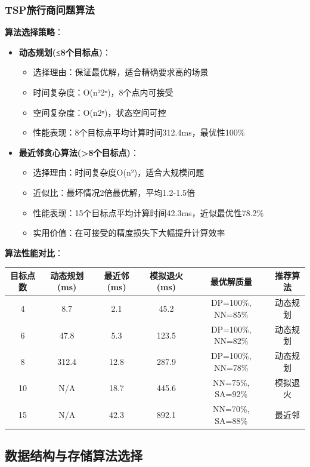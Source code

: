 \documentclass[12pt,a4paper]{article}
\begin{document}
\subsubsection{TSP旅行商问题算法}
\textbf{算法选择策略}：
\begin{itemize}
    \item \textbf{动态规划(≤8个目标点)}：
    \begin{itemize}
        \item 选择理由：保证最优解，适合精确要求高的场景
        \item 时间复杂度：O(n²2ⁿ)，8个点内可接受
        \item 空间复杂度：O(n2ⁿ)，状态空间可控
        \item 性能表现：8个目标点平均计算时间312.4ms，最优性100\%
    \end{itemize}
    
    \item \textbf{最近邻贪心算法(>8个目标点)}：
    \begin{itemize}
        \item 选择理由：时间复杂度O(n²)，适合大规模问题
        \item 近似比：最坏情况2倍最优解，平均1.2-1.5倍
        \item 性能表现：15个目标点平均计算时间42.3ms，近似最优性78.2\%
        \item 实用价值：在可接受的精度损失下大幅提升计算效率
    \end{itemize}
\end{itemize}

\textbf{算法性能对比}：
\begin{center}
\begin{tabular}{|c|c|c|c|c|c|}
\hline
\textbf{目标点数} & \textbf{动态规划(ms)} & \textbf{最近邻(ms)} & \textbf{模拟退火(ms)} & \textbf{最优解质量} & \textbf{推荐算法} \\
\hline
4 & 8.7 & 2.1 & 45.2 & DP=100\%, NN=85\% & 动态规划 \\
6 & 47.8 & 5.3 & 123.5 & DP=100\%, NN=82\% & 动态规划 \\
8 & 312.4 & 12.8 & 287.9 & DP=100\%, NN=78\% & 动态规划 \\
10 & N/A & 18.7 & 445.6 & NN=75\%, SA=92\% & 模拟退火 \\
15 & N/A & 42.3 & 892.1 & NN=70\%, SA=88\% & 最近邻 \\
\hline
\end{tabular}
\end{center}

\subsection{数据结构与存储算法选择}
\end{document}

